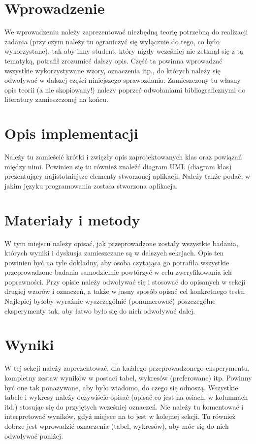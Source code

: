 \documentclass{classrep}
\begin{document}
\section{Wprowadzenie}
{\color{blue}
We wprowadzeniu należy zaprezentować niezbędną teorię potrzebną do realizacji
zadania (przy czym należy tu ograniczyć się wyłącznie do tego, co było
wykorzystane), tak aby inny student, który nigdy wcześniej nie zetknął się z tą
tematyką, potrafił zrozumieć dalszy opis. Część ta powinna wprowadzać wszystkie
wykorzystywane wzory, oznaczenia itp., do których należy się odwoływać w
dalszej części niniejszego sprawozdania. Zamieszczony tu własny opis teorii (a
nie skopiowany!) należy poprzeć odwołaniami bibliograficznymi do literatury
zamieszczonej na końcu.}

\section{Opis implementacji}
{\color{blue}
Należy tu zamieścić krótki i zwięzły opis zaprojektowanych klas oraz powiązań
między nimi. Powinien się tu również znaleźć diagram UML (diagram klas)
prezentujący najistotniejsze elementy stworzonej aplikacji. Należy także podać,
w jakim języku programowania została stworzona aplikacja.}

\section{Materiały i metody}
{\color{blue}
W tym miejscu należy opisać, jak przeprowadzone zostały wszystkie badania,
których wyniki i dyskusja zamieszczane są w dalszych sekcjach. Opis ten
powinien być na tyle dokładny, aby osoba czytająca go potrafiła wszystkie
przeprowadzone badania samodzielnie powtórzyć w celu zweryfikowania ich
poprawności. Przy opisie należy odwoływać się i stosować do
opisanych w sekcji drugiej wzorów i oznaczeń, a także w jasny sposób opisać
cel konkretnego testu. Najlepiej byłoby wyraźnie wyszczególnić (ponumerować)
poszczególne eksperymenty tak, aby łatwo było się do nich odwoływać dalej.}

\section{Wyniki}
{\color{blue}
W tej sekcji należy zaprezentować, dla każdego przeprowadzonego eksperymentu,
kompletny zestaw wyników w postaci tabel, wykresów (preferowane) itp. Powinny
być one tak ponazywane, aby było wiadomo, do czego się odnoszą. Wszystkie
tabele i wykresy należy oczywiście opisać (opisać co jest na osiach, w
kolumnach itd.) stosując się do przyjętych wcześniej oznaczeń. Nie należy tu
komentować i interpretować wyników, gdyż miejsce na to jest w kolejnej sekcji.
Tu również dobrze jest wprowadzić oznaczenia (tabel, wykresów), aby móc się do
nich odwoływać poniżej.}
\end{document}
